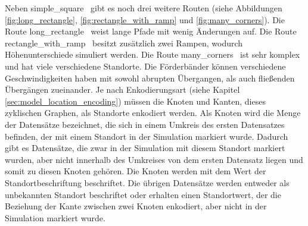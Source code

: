 \newline
\newline
Neben \glqq simple\_square \grqq\ gibt es noch drei weitere Routen (siehe Abbildungen \ref{fig:long_rectangle}, \ref{fig:rectangle_with_ramp} und \ref{fig:many_corners}).
Die Route \glqq long\_rectangle \grqq\ weist lange Pfade mit wenig Änderungen auf.
Die Route \glqq rectangle\_with\_ramp \grqq\ besitzt zusätzlich zwei Rampen, wodurch Höhenunterschiede simuliert werden.
Die Route \glqq many\_corners \grqq\ ist sehr komplex und hat viele verschiedene Standorte.
Die Förderbänder können verschiedene Geschwindigkeiten haben mit sowohl abrupten Übergangen, als auch fließenden Übergängen zueinander.
\newline
\newline
Je nach Enkodierungsart (siehe Kapitel \ref{sec:model_location_encoding}) müssen die Knoten und Kanten, dieses zyklischen Graphen, als Standorte enkodiert werden.
Als Knoten wird die Menge der Datensätze bezeichnet, die sich in einem Umkreis des ersten Datensatzes befinden, der mit einem Standort in der Simulation markiert wurde.
Dadurch gibt es Datensätze, die zwar in der Simulation mit diesem Standort markiert wurden, aber nicht innerhalb des Umkreises von dem ersten Datensatz liegen
und somit zu diesen Knoten gehören.
Die Knoten werden mit dem Wert der Standortbeschriftung beschriftet.
Die übrigen Datensätze werden entweder als unbekannten Standort beschriftet oder erhalten einen Standortwert, der die Beziehung der Kante zwischen zwei Knoten enkodiert,
aber nicht in der Simulation markiert wurde.
